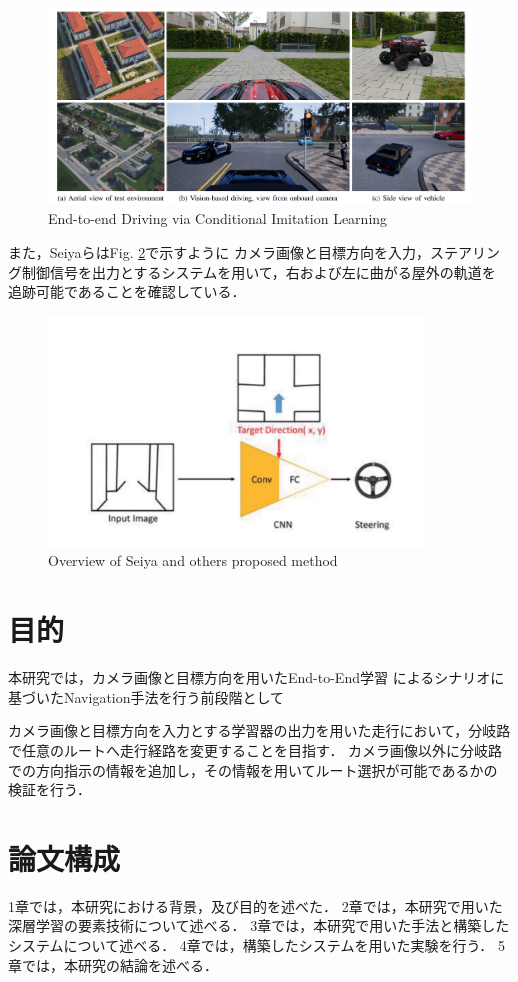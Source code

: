\begin{figure}[H]
    \centering
    \includegraphics[width = 15cm]{./figs/End-to-end_Driving_via_Conditional_Imitation_Learning.pdf}
    \caption{End-to-end  Driving  via  Conditional  Imitation  Learning\cite{razikon}}
    \label{fig::Conditional_Imitation_Learning}
\end{figure}

\newpage
また，Seiyaら\cite{nagoya}はFig. \ref{fig::nagoyaabst}で示すように
カメラ画像と目標方向を入力，ステアリング制御信号を出力とするシステムを用いて，右および左に曲がる屋外の軌道を
追跡可能であることを確認している．

\begin{figure}[H]
    \centering
    \includegraphics[width = 10cm]{./figs/End-to-End_Navigation_with_Branch_Turning_Support_using_Convolutional_Neural_Network_abst.pdf}
    \caption{Overview of Seiya and others proposed method}
    \label{fig::nagoyaabst}
\end{figure}


\section{目的}
本研究では，カメラ画像と目標方向を用いたEnd-to-End学習
によるシナリオに基づいたNavigation手法を行う前段階として

カメラ画像と目標方向を入力とする学習器の出力を用いた走行において，分岐路で任意のルートへ走行経路を変更することを目指す．
カメラ画像以外に分岐路での方向指示の情報を追加し，その情報を用いてルート選択が可能であるかの
検証を行う．


\section{論文構成}
1章では，本研究における背景，及び目的を述べた．
2章では，本研究で用いた深層学習の要素技術について述べる．
3章では，本研究で用いた手法と構築したシステムについて述べる．
4章では，構築したシステムを用いた実験を行う．
5章では，本研究の結論を述べる．
